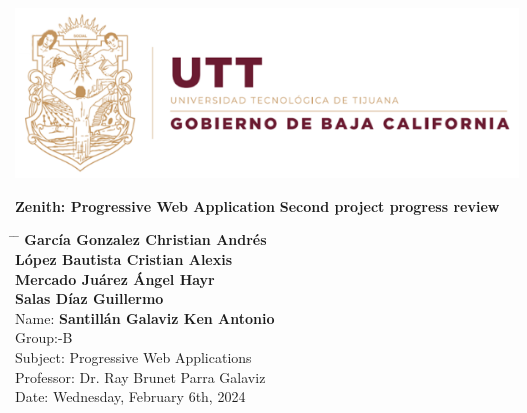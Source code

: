 \documentclass[12pt,a4paper]{article}
\title{}
\author{}
\date{}
\begin{document}
	
	\newcommand{\subf}[2]{%
		{\small\begin{tabular}[t]{@{}c@{}}
				#1\\#2
		\end{tabular}}%
	}
	
	\begin{titlepage}
		\begin{center}
			
			\textbf{}
            \includegraphics[width=1\textwidth]{utt.png}

            \vspace*{3cm}

			\vspace{1.5cm}
			
			\Huge
			\textbf{Zenith: Progressive Web Application}
            \textbf{Second project progress review}
			
			\vspace{0.8cm}
			\large
			
			\vspace{0.5cm}
			\LARGE
			
			
			\vfill
			
			
			
			\vspace{0.8cm}
			
			
			
			\Large
			
			
			
			
		\end{center}
		\Large
		\begin{tabbing}
			\hspace*{1em}\= \hspace*{8em} \= \kill %
            \> \>\textbf{García Gonzalez Christian Andrés} \\
            \> \> \textbf{López Bautista Cristian Alexis} \\
             \> \>  \textbf{Mercado Juárez Ángel Hayr} \\
             \> \>  \textbf{Salas Díaz Guillermo} \\
			\> Name:\>  \textbf{Santillán Galaviz Ken Antonio} \\
			\> Group:\>  10-B \\
			\> Subject:\>  Progressive Web Applications  \\
			\> Professor:  \> Dr. Ray Brunet Parra Galaviz \\
			\> Date: \>  Wednesday, February 6th, 2024
		\end{tabbing}
		
	\end{titlepage}
	
\end{document}
